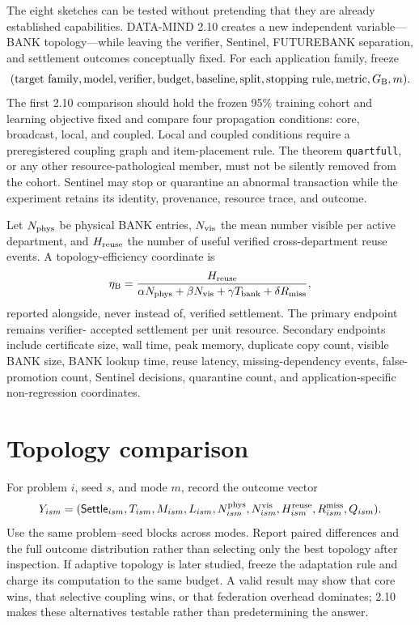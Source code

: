 \documentclass[11pt,oneside]{book}
\theoremstyle{definition}
\theoremstyle{remark}
\newcommand{\settle}{\mathsf{Settle}}
\begin{document}
The eight sketches can be tested without pretending that they are already established capabilities.
DATA-MIND 2.10 creates a new independent variable---BANK topology---while leaving the verifier,
Sentinel, FUTUREBANK separation, and settlement outcomes conceptually fixed. For each application
family, freeze
\[
(\text{target family},\text{model},\text{verifier},\text{budget},\text{baseline},
\text{split},\text{stopping rule},\text{metric},G_{\rm B},m).
\]
The first 2.10 comparison should hold the frozen 95\% training cohort and learning objective fixed and
compare four propagation conditions: core, broadcast, local, and coupled. Local and coupled
conditions require a preregistered coupling graph and item-placement rule. The theorem
\texttt{quartfull}, or any other resource-pathological member, must not be silently removed from the
cohort. Sentinel may stop or quarantine an abnormal transaction while the experiment retains its
identity, provenance, resource trace, and outcome.

Let \(N_{\rm phys}\) be physical BANK entries, \(N_{\rm vis}\) the mean number visible per active
department, and \(H_{\rm reuse}\) the number of useful verified cross-department reuse events. A
topology-efficiency coordinate is
\[
\eta_{\rm B}=
\frac{H_{\rm reuse}}
{\alpha N_{\rm phys}+\beta N_{\rm vis}+\gamma T_{\rm bank}+\delta R_{\rm miss}},
\]
reported alongside, never instead of, verified settlement. The primary endpoint remains verifier-
accepted settlement per unit resource. Secondary endpoints include certificate size, wall time, peak
memory, duplicate copy count, visible BANK size, BANK lookup time, reuse latency, missing-dependency
events, false-promotion count, Sentinel decisions, quarantine count, and application-specific
non-regression coordinates.

\section{Topology comparison}
For problem \(i\), seed \(s\), and mode \(m\), record the outcome vector
\[
Y_{ism}=(\settle_{ism},T_{ism},M_{ism},L_{ism},N^{\rm phys}_{ism},
N^{\rm vis}_{ism},H^{\rm reuse}_{ism},R^{\rm miss}_{ism},Q_{ism}).
\]
Use the same problem--seed blocks across modes. Report paired differences and the full outcome
distribution rather than selecting only the best topology after inspection. If adaptive topology is
later studied, freeze the adaptation rule and charge its computation to the same budget. A valid
result may show that core wins, that selective coupling wins, or that federation overhead dominates;
2.10 makes these alternatives testable rather than predetermining the answer.
\end{document}
